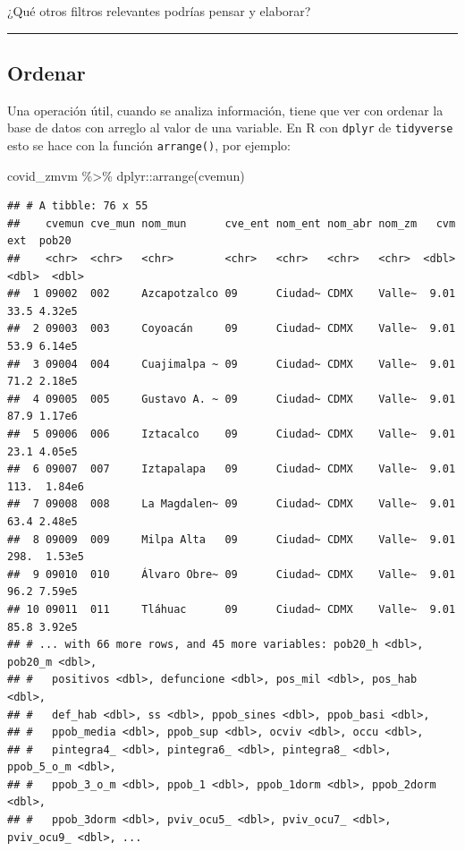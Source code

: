\documentclass[
  11pt,
  oneside]{book}
\newenvironment{Shaded}{\begin{snugshade}}{\end{snugshade}}
\newcommand{\FunctionTok}[1]{\textcolor[rgb]{0.00,0.00,0.00}{#1}}
\newcommand{\NormalTok}[1]{#1}
\newcommand{\SpecialCharTok}[1]{\textcolor[rgb]{0.00,0.00,0.00}{#1}}
\begin{document}
¿Qué otros filtros relevantes podrías pensar y elaborar?

\begin{center}\rule{0.5\linewidth}{0.5pt}\end{center}

\hypertarget{ordenar}{%
\subsection{Ordenar}\label{ordenar}}

Una operación útil, cuando se analiza información, tiene que ver con ordenar la base de datos con arreglo al valor de una variable. En R con \texttt{dplyr} de \texttt{tidyverse} esto se hace con la función \texttt{arrange()}, por ejemplo:

\begin{Shaded}
\begin{Highlighting}[]
\NormalTok{covid\_zmvm }\SpecialCharTok{\%\textgreater{}\%}\NormalTok{ dplyr}\SpecialCharTok{::}\FunctionTok{arrange}\NormalTok{(cvemun)}
\end{Highlighting}
\end{Shaded}

\begin{verbatim}
## # A tibble: 76 x 55
##    cvemun cve_mun nom_mun      cve_ent nom_ent nom_abr nom_zm   cvm   ext  pob20
##    <chr>  <chr>   <chr>        <chr>   <chr>   <chr>   <chr>  <dbl> <dbl>  <dbl>
##  1 09002  002     Azcapotzalco 09      Ciudad~ CDMX    Valle~  9.01  33.5 4.32e5
##  2 09003  003     Coyoacán     09      Ciudad~ CDMX    Valle~  9.01  53.9 6.14e5
##  3 09004  004     Cuajimalpa ~ 09      Ciudad~ CDMX    Valle~  9.01  71.2 2.18e5
##  4 09005  005     Gustavo A. ~ 09      Ciudad~ CDMX    Valle~  9.01  87.9 1.17e6
##  5 09006  006     Iztacalco    09      Ciudad~ CDMX    Valle~  9.01  23.1 4.05e5
##  6 09007  007     Iztapalapa   09      Ciudad~ CDMX    Valle~  9.01 113.  1.84e6
##  7 09008  008     La Magdalen~ 09      Ciudad~ CDMX    Valle~  9.01  63.4 2.48e5
##  8 09009  009     Milpa Alta   09      Ciudad~ CDMX    Valle~  9.01 298.  1.53e5
##  9 09010  010     Álvaro Obre~ 09      Ciudad~ CDMX    Valle~  9.01  96.2 7.59e5
## 10 09011  011     Tláhuac      09      Ciudad~ CDMX    Valle~  9.01  85.8 3.92e5
## # ... with 66 more rows, and 45 more variables: pob20_h <dbl>, pob20_m <dbl>,
## #   positivos <dbl>, defuncione <dbl>, pos_mil <dbl>, pos_hab <dbl>,
## #   def_hab <dbl>, ss <dbl>, ppob_sines <dbl>, ppob_basi <dbl>,
## #   ppob_media <dbl>, ppob_sup <dbl>, ocviv <dbl>, occu <dbl>,
## #   pintegra4_ <dbl>, pintegra6_ <dbl>, pintegra8_ <dbl>, ppob_5_o_m <dbl>,
## #   ppob_3_o_m <dbl>, ppob_1 <dbl>, ppob_1dorm <dbl>, ppob_2dorm <dbl>,
## #   ppob_3dorm <dbl>, pviv_ocu5_ <dbl>, pviv_ocu7_ <dbl>, pviv_ocu9_ <dbl>, ...
\end{verbatim}
\end{document}

